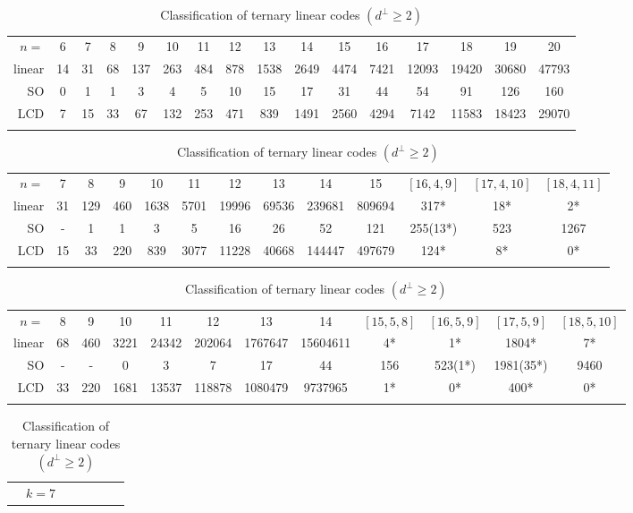 \documentclass[a4paper,11pt]{article}
\begin{document}
\begin{table}
\caption{Classification of ternary linear codes $(d^\perp\ge 2)$\label{table3}}
{\footnotesize
\begin{tabular}{r|c|c|c|c|c|c|c|c|c|c|c|c|c|c|c}
\hline\noalign{\smallskip}
\multicolumn{16}{c}{$k=3$} \\
\hline
$n=$    & 6 & 7 & 8 & 9 & 10& 11 &  12& 13& 14& 15& 16& 17& 18& 19& 20 \\
\hline
linear  &14&	31&	68&	137&	263&	484&	878&	1538&	2649&	4474&	7421&	12093&	19420&	30680&	47793\\
SO      & 0&	1&	1&	3&	4&	5&	10&	15&	17&	31&	44&	54&	91&	126&	160\\
LCD     & 7&	15&	33&	67&	132&	253&	471&	839&	1491&	2560&	4294&	7142&	11583&	18423&	29070\\
\noalign{\smallskip}\hline
\end{tabular}
\begin{tabular}{r|c|c|c|c|c|c|c|c|c|c|c|c}
\hline\noalign{\smallskip}
\multicolumn{13}{c}{$k=4$} \\
\hline
$n=$    & 7 & 8 & 9 & 10& 11 &  12& 13& 14& 15& $[16,4,9]$& $[17,4,10]$& $[18,4,11]$ \\
\hline
linear &31&	129&	460&	1638&	5701&	19996&	69536&	239681&	809694&	317*&	18*&	2*\\
SO &-&	1&	1&	3&	5&	16&	26&	52&	121&	255(13*)&	523&	1267\\
LCD &15&	33&	220&	839&	3077&	11228&	40668&	144447&	497679&	124*&	8*&	0*\\
\noalign{\smallskip}\hline
\end{tabular}
\begin{tabular}{r|c|c|c|c|c|c|c|c|c|c|c}
\hline\noalign{\smallskip}
\multicolumn{12}{c}{$k=5$} \\
\hline
$n=$    & 8 & 9 & 10& 11 &  12& 13& 14& $[15,5,8]$& $[16,5,9]$& $[17,5,9]$& $[18,5,10]$ \\
\hline
linear &68&	460&	3221&	24342&	202064&	1767647&	15604611&	4*&	1*&	1804*&	7*\\
SO &-&	-&	0&	3&	7&	17&	44&	156&	523(1*)&	1981(35*)&	9460\\
LCD &33&	220&	1681&	13537&	118878&	1080479&	9737965&	1*&	0*&	400*&	0*\\
\noalign{\smallskip}\hline
\end{tabular}
\begin{tabular}{r|c|c|c|c|c|c|c|c|c|c|c|c|c}
\hline\noalign{\smallskip}
\multicolumn{6}{c|}{$k=6$}&\multicolumn{8}{c}{$k=7$} \\

\end{tabular}}
\end{table}
\end{document}
